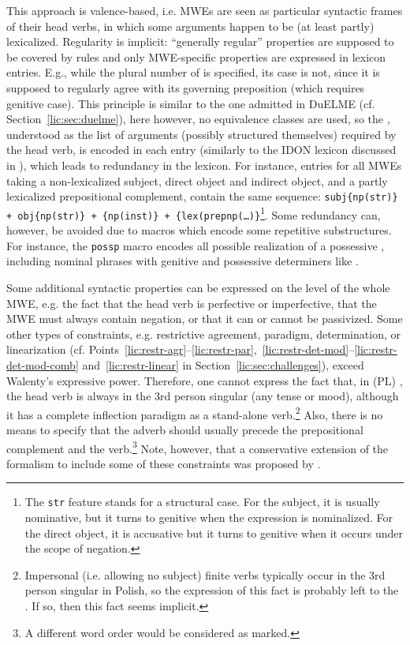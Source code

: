 \documentclass[output=paper]{langsci/langscibook}
\begin{document}
This approach is valence-based, i.e. MWEs are seen as particular syntactic frames of their head verbs, in which some arguments happen to be (at least partly) lexicalized. Regularity is implicit: ``generally regular'' properties are supposed to be covered by  rules and only MWE-specific properties are expressed in lexicon entries. E.g., while the plural number of  is specified, its case is not, since it is supposed to regularly agree with its governing preposition (which requires genitive case). This principle is similar to the one admitted in DuELME (cf. Section~\ref{lic:sec:duelme}), here however, no equivalence classes are used, so the , understood as the list of arguments (possibly structured themselves) required by the head verb, is encoded in each entry (similarly to the IDON lexicon discussed in ), which leads to redundancy in the lexicon. For instance, entries for all MWEs taking a non-lexicalized subject, direct object and indirect object, and a partly lexicalized prepositional complement, contain the same sequence: \texttt{subj\{np(str)\} + obj\{np(str)\} + \{np(inst)\} + \{lex(prepnp(\ldots)\}}\footnote{The \texttt{str} feature stands for a structural case. For the subject, it is usually nominative, but it turns to genitive when the expression is nominalized. For the direct object, it is accusative but it turns to genitive when it occurs under the scope of negation.}. Some redundancy can, however, be avoided due to macros which encode some repetitive substructures. For instance, the \texttt{possp} macro encodes all possible realization of a possessive , including nominal phrases with genitive and possessive determiners like .

Some additional syntactic properties can be expressed on the level of the whole MWE, e.g. the fact that the head verb is perfective or imperfective, that the MWE must always contain negation, or that it can or cannot be passivized. Some other types of constraints, e.g. restrictive agreement, paradigm, determination, or linearization (cf. Points~\ref{lic:restr-agr}--\ref{lic:restr-par},~\ref{lic:restr-det-mod}--\ref{lic:restr-det-mod-comb} and~\ref{lic:restr-linear} in Section~\ref{lic:sec:challenges}), exceed Walenty's expressive power. Therefore, one cannot express the fact that, in (PL) , the head verb  is always in the 3rd person singular (any tense or mood), although it has a complete inflection paradigm as a stand-alone verb.\footnote{Impersonal (i.e. allowing no subject) finite verbs typically occur in the 3rd person singular in Polish, so the expression of this fact is probably left to the . If so, then this fact seems implicit.} 
Also, there is no means to specify that the adverb  should usually precede the prepositional complement and the verb.\footnote{A different word order would be considered as marked.} 
Note, however, that a conservative extension of the formalism to include some of these constraints was proposed by \cite{prz:etal:16}.
\end{document}
